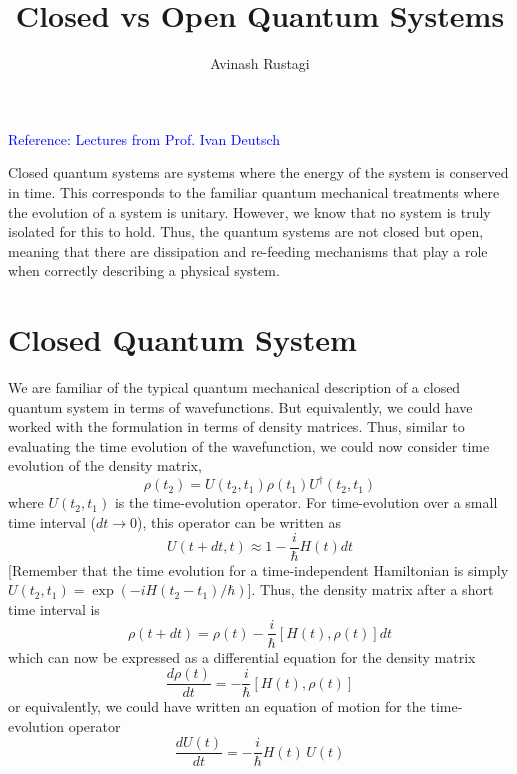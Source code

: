 \documentclass[aps,prb,onecolumn,notitlepage,showpacs,floatfix,superscriptaddress]{revtex4-1}
\begin{document}
\title{Closed vs Open Quantum Systems}

\author{Avinash Rustagi}
%

\maketitle
%
\noindent \textcolor{blue}{Reference: Lectures from Prof. Ivan Deutsch}
\vspace{0.2in}

Closed quantum systems are systems where the energy of the system is conserved in time. This corresponds to the familiar quantum mechanical treatments where the evolution of a system is unitary. However, we know that no system is truly isolated for this to hold. Thus, the quantum systems are not closed but open, meaning that there are dissipation and re-feeding mechanisms that play a role when correctly describing a physical system.

\section{Closed Quantum System}
We are familiar of the typical quantum mechanical description of a closed quantum system in terms of wavefunctions. But equivalently, we could have worked with the formulation in terms of density matrices. Thus, similar to evaluating the time evolution of the wavefunction, we could now consider time evolution of the density matrix,
\begin{equation}
\rho(t_2) = U(t_2,t_1) \rho(t_1) U^\dagger(t_2,t_1) 
\end{equation}
where $U(t_2,t_1)$ is the time-evolution operator. For time-evolution over a small time interval ($dt \rightarrow 0$), this operator can be written as 
\begin{equation}
U(t+dt,t) \approx 1 - \dfrac{i}{\hbar} H(t) dt
\end{equation}
[Remember that the time evolution for a time-independent Hamiltonian is simply $U(t_2,t_1)=\exp(-iH(t_2-t_1)/\hbar)$]. Thus, the density matrix after a short time interval is
\begin{equation}
\rho(t+dt) = \rho(t) - \dfrac{i}{\hbar} [H(t),\rho(t)] dt
\end{equation}
which can now be expressed as a differential equation for the density matrix
\begin{equation}
\dfrac{d\rho(t)}{dt} = - \dfrac{i}{\hbar} [H(t),\rho(t)]
\end{equation}
or equivalently, we could have written an equation of motion for the time-evolution operator
\begin{equation}
\dfrac{dU(t)}{dt} = - \dfrac{i}{\hbar} H(t) \, U(t)
\end{equation}
\end{document}
